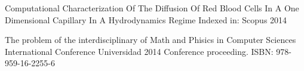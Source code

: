 


\begin{cventries}


\cventry
{Computational Characterization Of The Diffusion Of Red Blood Cells In A One Dimensional Capillary In A Hydrodynamics Regime} %
{Indexed in: Scopus} %
{2014} %


\cventry
{The problem of the interdisciplinary of Math and Phisics in Computer Sciences} %
{International Conference Universidad 2014} %
{ %
Conference proceeding. ISBN: 978-959-16-2255-6
}



\end{cventries}
